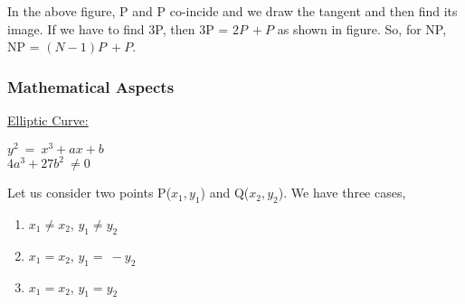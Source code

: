 \documentclass[11pt]{article}
\begin{document}
In the above figure, P and P co-incide and we draw the tangent and then find its image. If we have to find 3P, then 3P = $2P \ \boxed{+} P$ as shown in figure. So, for NP, NP = $(N-1)P \ \boxed{+} P$. \\
\subsubsection{Mathematical Aspects}
\underline{Elliptic Curve:}\\
\begin{center}
    $y^2\ =\ x^3+ax+b$\\
    \vspace{1mm}
    $4a^3+27b^2\ \neq 0$
\end{center}
Let us consider two points P($x_1, y_1$) and Q($x_2, y_2$). We have three cases,
\begin{enumerate}
    \item $x_1\neq x_2$, $y_1\neq y_2$
    \item $x_1= x_2$, $y_1=\  -y_2$
    \item $x_1= x_2$, $y_1= y_2$
    
\end{enumerate}
\end{document}
